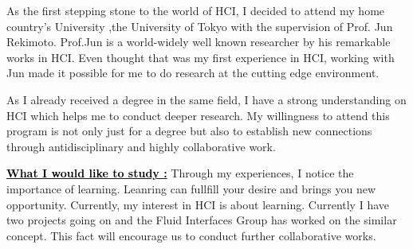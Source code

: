 \documentclass{article}
\newcommand{\statement}[1]{\par\medskip
  \underline{\textcolor{black}{\textbf{#1:}}}\space
}
\begin{document}

As the first stepping stone to the world of HCI, I decided to attend my home country's University ,the University of Tokyo with the supervision of Prof. Jun Rekimoto. Prof.Jun is a world-widely well known researcher by his remarkable works in HCI. Even thought that was my first experience in HCI, working with Jun made it possible for me to do research at the cutting edge environment. 

As I already received a degree in the same field, I have a strong understanding on HCI which helps me to conduct deeper research. My willingness to attend this program is not only just for a degree but also to establish new connections through antidisciplinary and highly collaborative work.


\statement{What I would like to study } Through my experiences, I notice the importance of learning. Leanring can fullfill your desire and brings you new opportunity. Currently, my interest in HCI is about learning. Currently I have two projects going on and the Fluid Interfaces Group has worked on the similar concept. This fact will encourage us to conduct further collaborative works.
\end{document}
